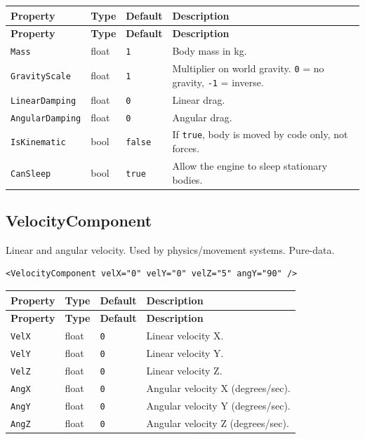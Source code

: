 \documentclass[11pt,a4paper]{article}
\begin{document}
\begin{longtable}{P{3.5cm} P{2cm} P{2.2cm} P{5.3cm}}
  \toprule
  \textbf{Property} & \textbf{Type} & \textbf{Default} & \textbf{Description} \\
  \midrule
  \endfirsthead
  \toprule
  \textbf{Property} & \textbf{Type} & \textbf{Default} & \textbf{Description} \\
  \midrule
  \endhead
  \texttt{Mass} & float & \texttt{1} & Body mass in kg. \\
  \texttt{GravityScale} & float & \texttt{1} &
    Multiplier on world gravity. \texttt{0} = no gravity, \texttt{-1} = inverse. \\
  \texttt{LinearDamping} & float & \texttt{0} & Linear drag. \\
  \texttt{AngularDamping} & float & \texttt{0} & Angular drag. \\
  \texttt{IsKinematic} & bool & \texttt{false} &
    If \texttt{true}, body is moved by code only, not forces. \\
  \texttt{CanSleep} & bool & \texttt{true} &
    Allow the engine to sleep stationary bodies. \\
  \bottomrule
\end{longtable}

\subsection{VelocityComponent}

Linear and angular velocity. Used by physics/movement systems.  Pure-data.

\begin{lstlisting}
<VelocityComponent velX="0" velY="0" velZ="5" angY="90" />
\end{lstlisting}

\begin{longtable}{P{3cm} P{2cm} P{2.5cm} P{5.5cm}}
  \toprule
  \textbf{Property} & \textbf{Type} & \textbf{Default} & \textbf{Description} \\
  \midrule
  \endfirsthead
  \toprule
  \textbf{Property} & \textbf{Type} & \textbf{Default} & \textbf{Description} \\
  \midrule
  \endhead
  \texttt{VelX} & float & \texttt{0} & Linear velocity X. \\
  \texttt{VelY} & float & \texttt{0} & Linear velocity Y. \\
  \texttt{VelZ} & float & \texttt{0} & Linear velocity Z. \\
  \texttt{AngX} & float & \texttt{0} & Angular velocity X (degrees/sec). \\
  \texttt{AngY} & float & \texttt{0} & Angular velocity Y (degrees/sec). \\
  \texttt{AngZ} & float & \texttt{0} & Angular velocity Z (degrees/sec). \\
  \bottomrule
\end{longtable}
\end{document}
